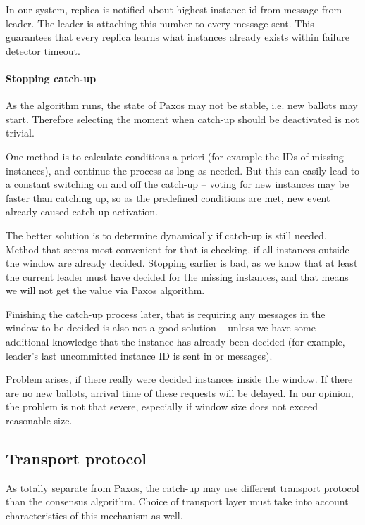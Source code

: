 In our system, replica is notified about highest instance id from \alive message from leader. The leader is attaching this number to every \alive message sent. This guarantees that every replica learns what instances already exists within failure detector timeout.

\paragraph*{Stopping catch-up} As the algorithm runs, the state of Paxos may not be stable, i.e. new ballots may start. Therefore selecting the moment when catch-up should be deactivated is not trivial.

One method is to calculate conditions a priori (for example the IDs of missing instances), and continue the process as long as needed. But this can easily lead to a constant switching on and off the catch-up -- voting for new instances may be faster than catching up, so as the predefined conditions are met, new event already caused catch-up activation.

The better solution is to determine dynamically if catch-up is still needed. Method that seems most convenient for that is checking, if all instances outside the window are already decided. Stopping earlier is bad, as we know that at least the current leader must have decided for the missing instances, and that means we will not get the value via Paxos algorithm.

Finishing the catch-up process later, that is requiring any messages in the window to be decided is also not a good solution -- unless we have some additional knowledge that the instance has already been decided (for example, leader's last uncommitted instance ID is sent in \propose or \alive messages).

Problem arises, if there really were decided instances inside the window. If there are no new ballots, arrival time of these requests will be delayed. In our opinion, the problem is not that severe, especially if window size does not exceed reasonable size.

\subsection{Transport protocol}
\label{subsec:transport_protocole}
As totally separate from Paxos, the catch-up may use different transport protocol than the consensus algorithm.
Choice of transport layer must take into account characteristics of this mechanism as well.

